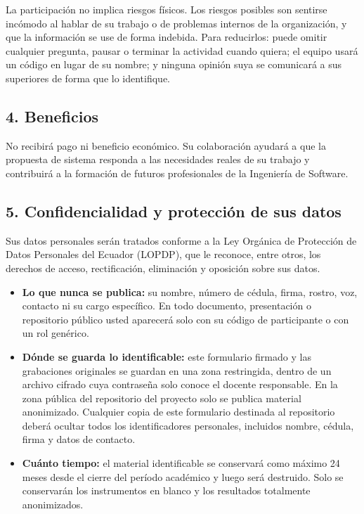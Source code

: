 La participación no implica riesgos físicos. Los riesgos posibles son sentirse incómodo al hablar de su trabajo o de problemas internos de la organización, y que la información se use de forma indebida. Para reducirlos: puede omitir cualquier pregunta, pausar o terminar la actividad cuando quiera; el equipo usará un código en lugar de su nombre; y ninguna opinión suya se comunicará a sus superiores de forma que lo identifique.

\subsection*{4. Beneficios}

No recibirá pago ni beneficio económico. Su colaboración ayudará a que la propuesta de sistema responda a las necesidades reales de su trabajo y contribuirá a la formación de futuros profesionales de la Ingeniería de Software.

\subsection*{5. Confidencialidad y protección de sus datos}

Sus datos personales serán tratados conforme a la Ley Orgánica de Protección de Datos Personales del Ecuador (LOPDP), que le reconoce, entre otros, los derechos de acceso, rectificación, eliminación y oposición sobre sus datos.
\begin{itemize}[leftmargin=*]
\item \textbf{Lo que nunca se publica:} su nombre, número de cédula, firma, rostro, voz, contacto ni su cargo específico. En todo documento, presentación o repositorio público usted aparecerá solo con su código de participante o con un rol genérico.
\item \textbf{Dónde se guarda lo identificable:} este formulario firmado y las grabaciones originales se guardan en una zona restringida, dentro de un archivo cifrado cuya contraseña solo conoce el docente responsable. En la zona pública del repositorio del proyecto solo se publica material anonimizado. Cualquier copia de este formulario destinada al repositorio deberá ocultar todos los identificadores personales, incluidos nombre, cédula, firma y datos de contacto.
\item \textbf{Cuánto tiempo:} el material identificable se conservará como máximo 24 meses desde el cierre del período académico y luego será destruido. Solo se conservarán los instrumentos en blanco y los resultados totalmente anonimizados.
\end{itemize}

